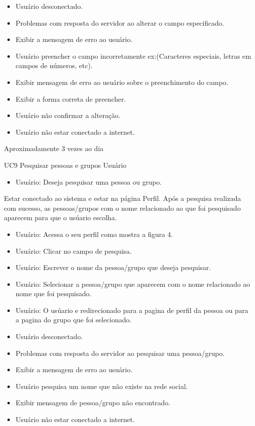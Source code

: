 {
\begin{itemize}
	\item Usuário desconectado.
	\item Problemas com resposta do servidor ao alterar o campo especificado.
	\item Exibir a mensagem de erro ao usuário.
	\item Usuário preencher o campo incorretamente ex:(Caracteres especiais, letras em campos de números, etc).
	\item Exibir mensagem de erro ao usuário sobre o preenchimento do campo.
	\item Exibir a forma correta de preencher.
	\item Usuário não confirmar a alteração.
	\item Usuário não estar conectado a internet.
\end{itemize}
}
{Aproximadamente 3 vezes ao dia}
{

}
\casoDeUso
{UC9}
{Pesquisar pessoas e grupos}
{Usuário}
{
\begin{itemize}
	\item Usuário: Deseja pesquisar uma pessoa ou grupo.	
\end{itemize}
}
{Estar conectado ao sistema e estar na página Perfil.}
{Após a pesquisa realizada com sucesso, as pessoas/grupos com o nome relacionado ao que foi pesquisado aparecem para que o usúario escolha.}
{
\begin{itemize}
	\item Usuário: Acessa o seu perfil como mostra a figura 4.
	\item Usuário: Clicar no campo de pesquisa.
	\item Usuário: Escrever o nome da pessoa/grupo que deseja pesquisar.
	\item Usuário: Selecionar a pessoa/grupo que aparecem com o nome relacionado ao nome que foi pesquisado.
	\item Usuário: O usúario e redirecionado para a pagina de perfil da pessoa ou para a pagina do grupo que foi selecionado.
\end{itemize}
}
{
\begin{itemize}
	\item Usuário desconectado.
	\item Problemas com resposta do servidor ao pesquisar uma pessoa/grupo.
	\item Exibir a mensagem de erro ao usuário.
	\item Usuário pesquisa um nome que não existe na rede social.
	\item Exibir mensagem de pessoa/grupo não encontrado.
	\item Usuário não estar conectado a internet.
\end{itemize}
}
